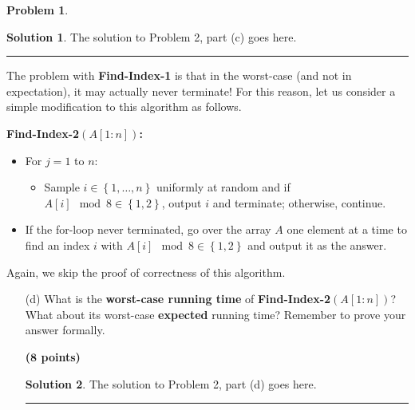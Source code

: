 \documentclass{article}
\theoremstyle{definition}
\newtheorem{problem}{Problem}
\def\fline{\rule{0.75\linewidth}{0.5pt}}
\newcommand{\finishline}{\begin{center}\fline\end{center}}
\newtheorem*{solution*}{Solution}
\newenvironment{solution}{\begin{solution*}}{{\finishline} \end{solution*}}
\newcommand{\grade}[1]{\hfill{\textbf{($\mathbf{#1}$ points)}}}
\newcommand{\set}[1]{\ensuremath{\left\{ #1 \right\}}}
\begin{document}
\begin{problem}
\begin{enumerate}
\begin{solution}
		The solution to Problem 2, part (c) goes here. 
	\end{solution}
	
	
\end{enumerate}

The problem with \textbf{Find-Index-1} is that in the worst-case (and not in expectation), it may actually never terminate! For this reason, let us consider 
a simple modification to  this algorithm as follows. 

\textbf{Find-Index-2$(A[1:n])$:} 
\begin{itemize}
	\item For $j=1$ to $n$: 
	\begin{itemize}
		\item Sample $i \in \set{1,\ldots,n}$ uniformly at random and if $A[i] \mod 8 \in \set{1,2}$, output $i$ and terminate; otherwise, continue. 
	\end{itemize}
	\item If the for-loop never terminated, go over the array $A$ one element at a time to find an index $i$ with $A[i] \mod 8 \in \set{1,2}$ and output it as the answer. 
\end{itemize}

Again, we skip the proof of correctness of this algorithm. 

\begin{enumerate}
\item[(d)] What is the \textbf{worst-case running time} of \textbf{Find-Index-2$(A[1:n])$}? What about its worst-case \textbf{expected} running time? Remember to prove your answer formally.

\grade{8} 

\begin{solution}
		The solution to Problem 2, part (d) goes here. 
	\end{solution}
	
\end{enumerate}

\end{problem}

\smallskip
\end{document}
